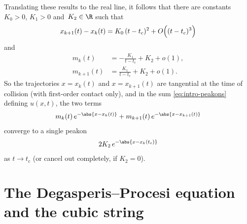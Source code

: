 \documentclass[10pt,a4paper]{article} \pdfoutput=1 
\begin{document}
Translating these results to the real line, it follows that there are constants $K_0 > 0$, $K_1 > 0$
and~$K_2 \in \R$ such that
\begin{equation}
  x_{k+1}(t) - x_k(t) = K_0 \, (t-t_c)^2  + O \Bigl( (t-t_c)^3 \Bigr)
\end{equation}
and
\begin{equation}
  \begin{aligned}
    m_k(t) &= - \frac{K_1}{t-t_c} + K_2 + o(1)
    ,\\
    m_{k+1}(t) &= \frac{K_1}{t-t_c} + K_2 + o(1)
    .
  \end{aligned}
\end{equation}
So the trajectories $x=x_k(t)$ and $x=x_{k+1}(t)$
are tangential at the time of collision (with first-order contact only),
and in the sum \eqref{eq:intro-peakons} defining $u(x,t)$,
the two terms
\begin{equation*}
  m_{k}(t) \, e^{-\abs{x - x_{k}(t)}}
  + m_{k+1}(t) \, e^{-\abs{x - x_{k+1}(t)}}
\end{equation*}
converge to a single peakon
\begin{equation*}
  2 K_2 \, e^{-\abs{x - x_{k}(t_c)}}
\end{equation*}
as $t \to t_c$
(or cancel out completely, if $K_2=0$).












\section{The Degasperis--Procesi equation and the cubic string}
\label{sec:DP}
\end{document}
